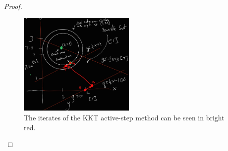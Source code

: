 \documentclass[12pt]{report}
\begin{document}
\begin{problem}
\begin{proof}
\begin{enumerate}
    \begin{figure}
        \centering
        \includegraphics[width=0.5\textwidth,height=\textwidth,keepaspectratio]{plokt2.jpg}
        \caption{The iterates of the KKT active-step method can be seen in bright red.}
        \label{fig22}
    \end{figure}
    
    
    
    
    
    
    
    
    
    
    
    
    
    
    

\end{enumerate}
\end{proof}
\end{problem}
\end{document}
